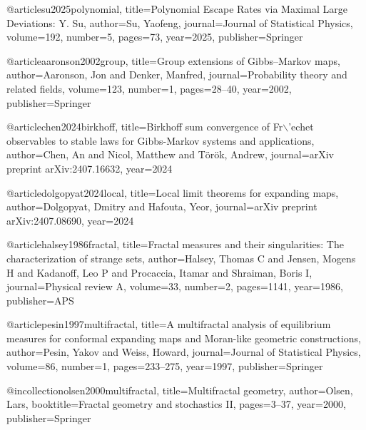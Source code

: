 @article{su2025polynomial,
  title={Polynomial Escape Rates via Maximal Large Deviations: Y. Su},
  author={Su, Yaofeng},
  journal={Journal of Statistical Physics},
  volume={192},
  number={5},
  pages={73},
  year={2025},
  publisher={Springer}
}



@article{aaronson2002group,
  title={Group extensions of Gibbs--Markov maps},
  author={Aaronson, Jon and Denker, Manfred},
  journal={Probability theory and related fields},
  volume={123},
  number={1},
  pages={28--40},
  year={2002},
  publisher={Springer}
}



 @article{chen2024birkhoff,
  title={Birkhoff sum convergence of Fr$\backslash$'echet observables to stable laws for Gibbs-Markov systems and applications},
  author={Chen, An and Nicol, Matthew and T{\"o}r{\"o}k, Andrew},
  journal={arXiv preprint arXiv:2407.16632},
  year={2024}
}


@article{dolgopyat2024local,
  title={Local limit theorems for expanding maps},
  author={Dolgopyat, Dmitry and Hafouta, Yeor},
  journal={arXiv preprint arXiv:2407.08690},
  year={2024}
}




@article{halsey1986fractal,
  title={Fractal measures and their singularities: The characterization of strange sets},
  author={Halsey, Thomas C and Jensen, Mogens H and Kadanoff, Leo P and Procaccia, Itamar and Shraiman, Boris I},
  journal={Physical review A},
  volume={33},
  number={2},
  pages={1141},
  year={1986},
  publisher={APS}
}


 @article{pesin1997multifractal,
  title={A multifractal analysis of equilibrium measures for conformal expanding maps and Moran-like geometric constructions},
  author={Pesin, Yakov and Weiss, Howard},
  journal={Journal of Statistical Physics},
  volume={86},
  number={1},
  pages={233--275},
  year={1997},
  publisher={Springer}
}


@incollection{olsen2000multifractal,
  title={Multifractal geometry},
  author={Olsen, Lars},
  booktitle={Fractal geometry and stochastics II},
  pages={3--37},
  year={2000},
  publisher={Springer}
}


